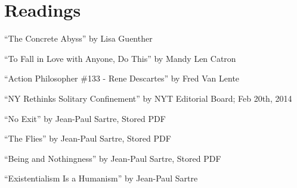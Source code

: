 \documentclass[11 pt, twoside]{article}
\begin{document}
\section{Readings}
\begin{enumerate}
\hypertarget{1}{\item ``The Concrete Abyss'' by Lisa Guenther}
\hypertarget{2}{\item ``To Fall in Love with Anyone, Do This'' by Mandy Len Catron}
\hypertarget{3}{\item ``Action Philosopher \#133 - Rene Descartes'' by Fred Van Lente}
\hypertarget{4}{\item ``NY Rethinks Solitary Confinement'' by NYT Editorial Board; Feb 20th, 2014}
\hypertarget{5}{\item ``No Exit'' by Jean-Paul Sartre, Stored PDF}
\hypertarget{6}{\item ``The Flies'' by Jean-Paul Sartre, Stored PDF}
\hypertarget{7}{\item ``Being and Nothingness'' by Jean-Paul Sartre, Stored PDF}
\hypertarget{8}{\item ``Existentialism Is a Humanism'' by Jean-Paul Sartre}
\end{enumerate}
\end{document}
